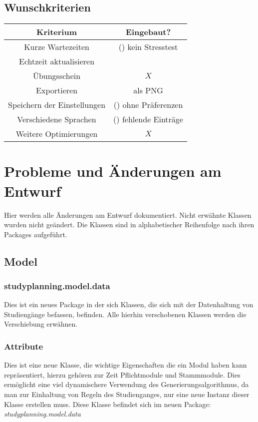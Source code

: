 \documentclass[parskip=full]{scrartcl}
\begin{document}
	\subsection{Wunschkriterien}
	\begin{tabular}{|c|c|}
		\hline 
		\textbf{Kriterium} & \textbf{Eingebaut?} \\ 
		\hline 
		Kurze Wartezeiten & (\checkmark) kein Stresstest \\ 
		Echtzeit aktualisieren & \checkmark \\ 
		Übungsschein & $X$ \\ 
		Exportieren & \checkmark als PNG \\ 
		Speichern der Einstellungen & (\checkmark) ohne Präferenzen \\ 
		Verschiedene Sprachen & (\checkmark) fehlende Einträge \\ 
		Weitere Optimierungen & $X$ \\ 
		\hline 
	\end{tabular} 	
	
	\section{Probleme und Änderungen am Entwurf}
		Hier werden alle Änderungen am Entwurf dokumentiert. Nicht erwähnte Klassen wurden nicht geändert.
		Die Klassen sind in alphabetischer Reihenfolge nach ihren Packages aufgeführt.
		\subsection{Model}
		
			\subsubsection{studyplanning.model.data}
				Dies ist ein neues Package in der sich Klassen, die sich mit der Datenhaltung von Studiengänge befassen, befinden.
				Alle hierhin verschobenen Klassen werden die Verschiebung erwähnen.
			
			\subsubsection{Attribute}
				Dies ist eine neue Klasse, die wichtige Eigenschaften die ein Modul haben kann repräsentiert, hierzu gehören zur Zeit Pflichtmodule und Stammmodule. Dies ermöglicht eine viel dynamischere Verwendung des Generierungsalgorithmus, da man zur Einhaltung von Regeln des Studienganges, nur eine neue Instanz dieser Klasse erstellen muss.
				Diese Klasse befindet sich im neuen Package: \textit{studyplanning.model.data}
			
\end{document}
